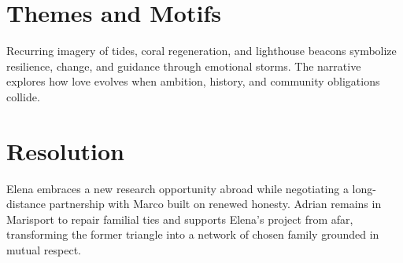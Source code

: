 \section*{Themes and Motifs}
Recurring imagery of tides, coral regeneration, and lighthouse beacons symbolize resilience, change, and guidance through emotional storms. The narrative explores how love evolves when ambition, history, and community obligations collide.

\section*{Resolution}
Elena embraces a new research opportunity abroad while negotiating a long-distance partnership with Marco built on renewed honesty. Adrian remains in Marisport to repair familial ties and supports Elena's project from afar, transforming the former triangle into a network of chosen family grounded in mutual respect.
